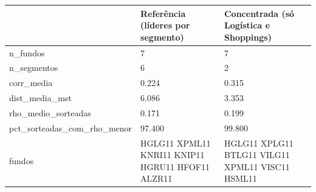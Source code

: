 \begin{tabular}{lll}
\toprule
 & Referência (líderes por segmento) & Concentrada (só Logística e Shoppings) \\
\midrule
n\_fundos & 7 & 7 \\
n\_segmentos & 6 & 2 \\
corr\_media & 0.224 & 0.315 \\
dist\_media\_mst & 6.086 & 3.353 \\
rho\_medio\_sorteadas & 0.171 & 0.199 \\
pct\_sorteadas\_com\_rho\_menor & 97.400 & 99.800 \\
fundos & HGLG11 XPML11 KNRI11 KNIP11 HGRU11 HFOF11 ALZR11 & HGLG11 XPLG11 BTLG11 VILG11 XPML11 VISC11 HSML11 \\
\bottomrule
\end{tabular}
